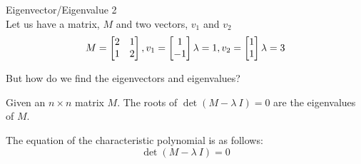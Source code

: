 \begin{exmp}{Eigenvector/Eigenvalue 2}\\
Let us have a matrix, $M$ and two vectors, $v_{1}$ and $v_{2}$
    \[
    M = \begin{bmatrix}
        2   &   1\\
        1   &   2\\
    \end{bmatrix} , 
    v_1 = \begin{bmatrix}
         1\\
         -1\\
        \end{bmatrix}\\ \lambda = 1,
    v_2 = \begin{bmatrix}
        1\\
        1\\
        \end{bmatrix}\\
\lambda = 3
    \]
\end{exmp}



But how do we find the eigenvectors and eigenvalues? 
\begin{proposition}
    Given an $n \times n$ matrix $M$. The roots of $\det(M-\lambda~I) =0$ are the eigenvalues of $M$.
\end{proposition}

The equation of the characteristic polynomial is as follows:
\begin{equation}
\det(M-\lambda~I) = 0 
\end{equation} 

